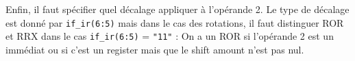 \documentclass{article}
\begin{document}
Enfin, il faut spécifier quel décalage appliquer à l'opérande 2.
Le type de décalage est donné par \texttt{if\_ir(6:5)} mais dans le cas des rotations,
il faut distinguer ROR et RRX dans le cas \texttt{if\_ir(6:5)} = \texttt{"11"} :
On a un ROR si l'opérande 2 est un immédiat ou si c'est un register mais que le shift amount n'est pas nul.



\end{document}
